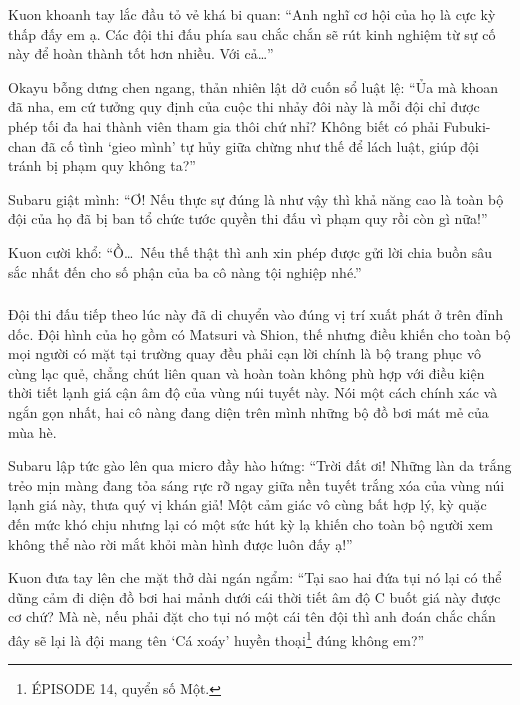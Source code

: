 \documentclass[../main.tex]{subfiles}
\begin{document}
Kuon khoanh tay lắc đầu tỏ vẻ khá bi quan: ``Anh nghĩ cơ hội của họ là cực kỳ thấp đấy em ạ. Các đội thi đấu phía sau chắc chắn sẽ rút kinh nghiệm từ sự cố này để hoàn thành tốt hơn nhiều. Với cả\dots''

Okayu bỗng dưng chen ngang, thản nhiên lật dở cuốn sổ luật lệ: ``Ủa mà khoan đã nha, em cứ tưởng quy định của cuộc thi nhảy đôi này là mỗi đội chỉ được phép tối đa hai thành viên tham gia thôi chứ nhỉ? Không biết có phải Fubuki-chan đã cố tình `gieo mình' tự hủy giữa chừng như thế để lách luật, giúp đội tránh bị phạm quy không ta?''

Subaru giật mình: ``Ơ! Nếu thực sự đúng là như vậy thì khả năng cao là toàn bộ đội của họ đã bị ban tổ chức tước quyền thi đấu vì phạm quy rồi còn gì nữa!''

Kuon cười khổ: ``Ồ\dots\ Nếu thế thật thì anh xin phép được gửi lời chia buồn sâu sắc nhất đến cho số phận của ba cô nàng tội nghiệp nhé.''

\subsubsection*{\label{ep-003.II}}

Đội thi đấu tiếp theo lúc này đã di chuyển vào đúng vị trí xuất phát ở trên đỉnh dốc. Đội hình của họ gồm có Matsuri và Shion, thế nhưng điều khiến cho toàn bộ mọi người có mặt tại trường quay đều phải cạn lời chính là bộ trang phục vô cùng lạc quẻ, chẳng chút liên quan và hoàn toàn không phù hợp với điều kiện thời tiết lạnh giá cận âm độ của vùng núi tuyết này. Nói một cách chính xác và ngắn gọn nhất, hai cô nàng đang diện trên mình những bộ đồ bơi mát mẻ của mùa hè.

Subaru lập tức gào lên qua micro đầy hào hứng: ``Trời đất ơi! Những làn da trắng trẻo mịn màng đang tỏa sáng rực rỡ ngay giữa nền tuyết trắng xóa của vùng núi lạnh giá này, thưa quý vị khán giả! Một cảm giác vô cùng bất hợp lý, kỳ quặc đến mức khó chịu nhưng lại có một sức hút kỳ lạ khiến cho toàn bộ người xem không thể nào rời mắt khỏi màn hình được luôn đấy ạ!''

Kuon đưa tay lên che mặt thở dài ngán ngẩm: ``Tại sao hai đứa tụi nó lại có thể dũng cảm đi diện đồ bơi hai mảnh dưới cái thời tiết âm độ C buốt giá này được cơ chứ? Mà nè, nếu phải đặt cho tụi nó một cái tên đội thì anh đoán chắc chắn đây sẽ lại là đội mang tên `Cá xoáy' huyền thoại\footnote{{\flaregothic ÉPISODE 14}, quyển số Một.} đúng không em?''
\end{document}
